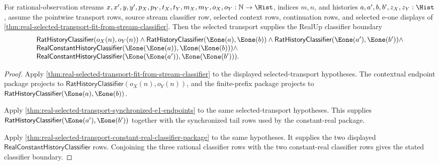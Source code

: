
\begin{theorem}
\label{thm:real-selected-transport-fit-classifier-obligation}
For rational-observation streams
$x,x',y,y',p_X,p_Y,t_X,t_Y,m_X,m_Y,o_X,o_Y:\mathbb{N}\to\Hist$,
indices $m,n$, and histories $a,a',b,b',z_X,z_Y:\Hist$, assume the pointwise
transport rows, source stream classifier row, selected context rows,
continuation rows, and selected e-one displays of
\autoref{thm:real-selected-transport-fit-from-stream-classifier}. Then the
selected transport supplies the RealUp classifier boundary
$$
\begin{array}{l}
\mathsf{RatHistoryClassifier}(o_X(n),o_Y(n))\land
\mathsf{RatHistoryClassifier}(\Eone(a),\Eone(b))\land
\mathsf{RatHistoryClassifier}(\Eone(a'),\Eone(b'))\land\\
\mathsf{RealConstantHistoryClassifier}(\Eone(\Eone(a)),\Eone(\Eone(b)))\land\\
\mathsf{RealConstantHistoryClassifier}(\Eone(\Eone(a')),\Eone(\Eone(b'))).
\end{array}
$$
\end{theorem}
\begin{proof}
Apply
\autoref{thm:real-selected-transport-fit-from-stream-classifier} to the
displayed selected-transport hypotheses. The contextual endpoint package
projects to $\mathsf{RatHistoryClassifier}(o_X(n),o_Y(n))$, and the
finite-prefix package projects to
$\mathsf{RatHistoryClassifier}(\Eone(a),\Eone(b))$.

Apply \autoref{thm:real-selected-transport-synchronized-e1-endpoints} to the
same selected-transport hypotheses. This supplies
$\mathsf{RatHistoryClassifier}(\Eone(a'),\Eone(b'))$ together with the
synchronized tail rows used by the constant-real package.

Apply
\autoref{thm:real-selected-transport-constant-real-classifier-package} to the
same hypotheses. It supplies the two displayed
$\mathsf{RealConstantHistoryClassifier}$ rows. Conjoining the three rational
classifier rows with the two constant-real classifier rows gives the stated
classifier boundary.
\end{proof}

